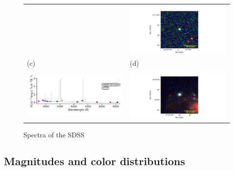 \documentclass[fleqn,usenatbib]{mnras}
\begin{document}
\begin{figure}
\begin{tabular}{ll}
    & \includegraphics[width=0.4\linewidth, trim=10 0 10 20, clip]{Figs/STRIPE82-0147-005730_343-1_100_r.pdf} \\
    (c) & (d) \\
    \includegraphics[trim=10 0 10 20, clip]{Figs/spec-1089-52913-0196-STRIPE82-0007-024265.pdf}
    & \includegraphics[width=0.4\linewidth, trim=10 0 10 20, clip]{Figs/STRIPE82-0007-024265_3-0_100_r.pdf} \\
  \end{tabular}
  \caption{Spectra of the SDSS}
  \label{fig:color-diagram}
\end{figure}

\subsection{Magnitudes and color distributions}
\end{document}
